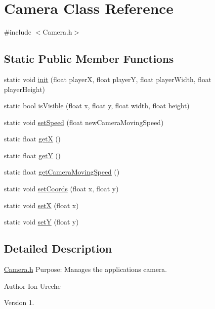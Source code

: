 \hypertarget{class_camera}{}\section{Camera Class Reference}
\label{class_camera}


{\ttfamily \#include $<$Camera.\+h$>$}

\subsection*{Static Public Member Functions}
\begin{DoxyCompactItemize}
\item 
static void \hyperlink{class_camera_a47dc02d3d741ad47a249dfbbc96069a2}{init} (float player\+X, float player\+Y, float player\+Width, float player\+Height)
\item 
static bool \hyperlink{class_camera_aedd574cbd0a6f799aa6f15865d4fd553}{is\+Visible} (float x, float y, float width, float height)
\item 
static void \hyperlink{class_camera_ac132953a621f29c9f5aa1e37bfa4e1db}{set\+Speed} (float new\+Camera\+Moving\+Speed)
\item 
static float \hyperlink{class_camera_ac610adc3428b5bf3d94f355abeca953d}{get\+X} ()
\item 
static float \hyperlink{class_camera_ada87410869fe5a98f8477664ad2e25ac}{get\+Y} ()
\item 
static float \hyperlink{class_camera_a0732508f67717e7fd0cde7b27d012d12}{get\+Camera\+Moving\+Speed} ()
\item 
static void \hyperlink{class_camera_a852f9987f68d5e722462a2bdb0797693}{set\+Coords} (float x, float y)
\item 
static void \hyperlink{class_camera_aa9f8596fa1f4c04187749024196fc337}{set\+X} (float x)
\item 
static void \hyperlink{class_camera_a17e3fdb2a83f30379f2f8e9dbf9ad66d}{set\+Y} (float y)
\end{DoxyCompactItemize}


\subsection{Detailed Description}
\hyperlink{_camera_8h_source}{Camera.\+h} Purpose\+: Manages the application\textquotesingle{}s camera.

\begin{DoxyAuthor}{Author}
Ion Ureche 
\end{DoxyAuthor}
\begin{DoxyVersion}{Version}
1. 
\end{DoxyVersion}


